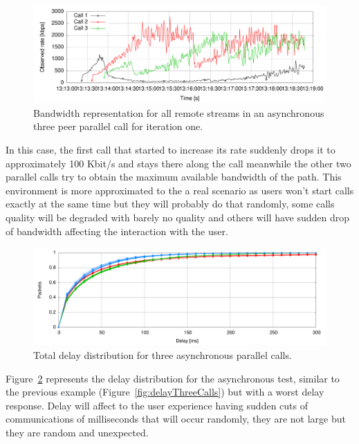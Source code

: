 \begin{figure}[h]
  \centering
    \includegraphics[width=1\textwidth]{./figures/async_three-calls.pdf}
      \caption[Bandwidth representation for all remote streams in an asynchronous three peer parallel call for iteration one]{Bandwidth representation for all remote streams in an asynchronous three peer parallel call for iteration one.}
	\label{fig:three_parallel}
\end{figure}

In this case, the first call that started to increase its rate suddenly drops it to approximately 100 Kbit/s and stays there along the call meanwhile the other two parallel calls try to obtain the maximum available bandwidth of the path. This environment is more approximated to the a real scenario as users won't start calls exactly at the same time but they will probably do that randomly, some calls quality will be degraded with barely no quality and others will have sudden drop of bandwidth affecting the interaction with the user.

\begin{figure}[h]
  \centering
    \includegraphics[width=1\textwidth]{./figures/async_total_delay_distribution.pdf}
      \caption[Total delay distribution for three asynchronous parallel calls]{Total delay distribution for three asynchronous parallel calls.}
	\label{fig:delayThreeCallsAsync}
\end{figure}

Figure~\ref{fig:delayThreeCallsAsync} represents the delay distribution for the asynchronous test, similar to the previous example (Figure~\ref{fig:delayThreeCalls}) but with a worst delay response. Delay will affect to the user experience having sudden cuts of communications of milliseconds that will occur randomly, they are not large but they are random and unexpected.

